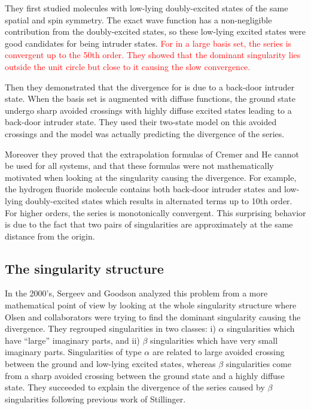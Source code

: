 \documentclass[aps,prb,reprint,noshowkeys,superscriptaddress]{revtex4-1}
\newcommand{\titou}[1]{\textcolor{red}{#1}}
\begin{document}
They first studied molecules with low-lying doubly-excited states of the same spatial and spin symmetry.
The exact wave function has a non-negligible contribution from the doubly-excited states, so these low-lying excited states were good candidates for being intruder states. \titou{For  in a large basis set, the series is convergent up to the 50th order. They showed that the dominant singularity lies outside the unit circle but close to it causing the slow convergence.}

Then they demonstrated that the divergence for  is due to a back-door intruder state. When the basis set is augmented with diffuse functions, the ground state undergo sharp avoided crossings with highly diffuse excited states leading to a back-door intruder state. They used their two-state model on this avoided crossings and the model was actually predicting the divergence of the series. 

Moreover they proved that the extrapolation formulas of Cremer and He \cite{Cremer_1996} cannot be used for all systems, and that these formulas were not mathematically motivated when looking at the singularity causing the divergence. For example, the hydrogen fluoride molecule contains both back-door intruder states and low-lying doubly-excited states which results in alternated terms up to 10th order. For higher orders, the series is monotonically convergent. This surprising behavior is due to the fact that two pairs of singularities are approximately at the same distance from the origin.

\subsection{The singularity structure}
In the 2000's, Sergeev and Goodson \cite{Sergeev_2005, Sergeev_2006} analyzed this problem from a more mathematical point of view by looking at the whole singularity structure where Olsen and collaborators were trying to find the dominant singularity causing the divergence. They regrouped singularities in two classes: i) $\alpha$ singularities which have ``large'' imaginary parts, and ii) $\beta$ singularities which have very small imaginary parts. Singularities of type $\alpha$ are related to large avoided crossing between the ground and low-lying excited states, whereas $\beta$ singularities come from a sharp avoided crossing between the ground state and a highly diffuse state. They succeeded to explain the divergence of the series caused by $\beta$ singularities following previous work of Stillinger. \cite{Stillinger_2000}
\end{document}
